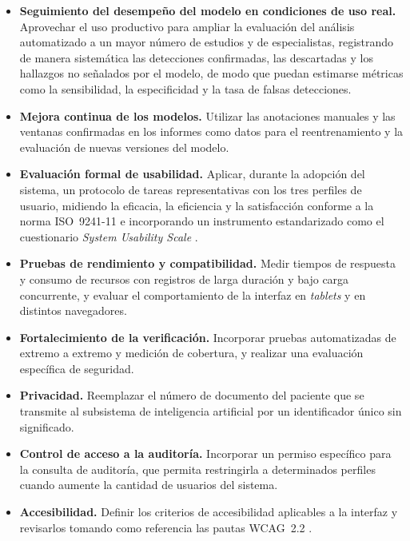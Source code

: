 \begin{itemize}
    \item \textbf{Seguimiento del desempeño del modelo en condiciones de uso real.}
    Aprovechar el uso productivo para ampliar la evaluación del análisis automatizado a un mayor número de estudios y de especialistas, registrando de manera sistemática las detecciones confirmadas, las descartadas y los hallazgos no señalados por el modelo, de modo que puedan estimarse métricas como la sensibilidad, la especificidad y la tasa de falsas detecciones.

    \item \textbf{Mejora continua de los modelos.}
    Utilizar las anotaciones manuales y las ventanas confirmadas en los informes como datos para el reentrenamiento y la evaluación de nuevas versiones del modelo.

    \item \textbf{Evaluación formal de usabilidad.}
    Aplicar, durante la adopción del sistema, un protocolo de tareas representativas con los tres perfiles de usuario, midiendo la eficacia, la eficiencia y la satisfacción conforme a la norma ISO~9241-11 \citep{ISO9241-11:2018} e incorporando un instrumento estandarizado como el cuestionario \textit{System Usability Scale} \citep{Brooke1996SUS}.

    \item \textbf{Pruebas de rendimiento y compatibilidad.}
    Medir tiempos de respuesta y consumo de recursos con registros de larga duración y bajo carga concurrente, y evaluar el comportamiento de la interfaz en \textit{tablets} y en distintos navegadores.

    \item \textbf{Fortalecimiento de la verificación.}
    Incorporar pruebas automatizadas de extremo a extremo y medición de cobertura, y realizar una evaluación específica de seguridad.

    \item \textbf{Privacidad.}
    Reemplazar el número de documento del paciente que se transmite al subsistema de inteligencia artificial por un identificador único sin significado.

    \item \textbf{Control de acceso a la auditoría.}
    Incorporar un permiso específico para la consulta de auditoría, que permita restringirla a determinados perfiles cuando aumente la cantidad de usuarios del sistema.

    \item \textbf{Accesibilidad.}
    Definir los criterios de accesibilidad aplicables a la interfaz y revisarlos tomando como referencia las pautas WCAG~2.2 \citep{W3C2023WCAG22}.


\end{itemize}
